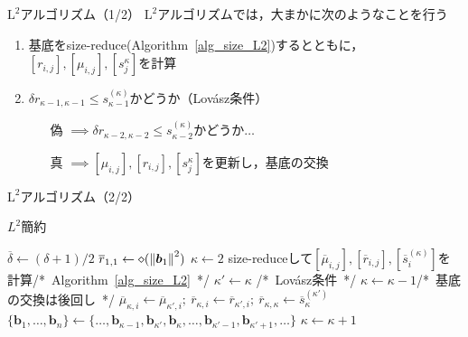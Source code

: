 \documentclass[12pt,aspectratio=169,table,dvipdfmx, leqno]{beamer}
\renewcommand{\Comment}[1]{\quad/*~#1~*/}
\begin{document}
\begin{frame}{$\text{L}^2$アルゴリズム（1/2）}
$\text{L}^2$アルゴリズムでは，大まかに次のようなことを行う
\begin{enumerate}
    \item 基底をsize-reduce(Algorithm~\ref{alg_size_L2})するとともに，$[r_{i, j}], [\mu_{i, j}], [s_j^{\kappa}]$を計算
    \item $\delta r_{\kappa-1, \kappa-1}\le s_{\kappa-1}^{(\kappa)}$かどうか（Lov\'asz条件）
    \begin{itemize}
        \item[偽] $\implies$$\delta r_{\kappa-2, \kappa-2}\le s_{\kappa-2}^{(\kappa)}$かどうか$\ldots$
        \item[真] $\implies$$[\mu_{i, j}], [r_{i, j}], [s_j^{\kappa}]$を更新し，基底の交換 
    \end{itemize}
\end{enumerate}
\end{frame}

\begin{frame}{$\text{L}^2$アルゴリズム（2/2）}
\begin{algorithm}[H]
    \footnotesize
    \begin{algorithmic}[1]
        \caption{\footnotesize $L^2$簡約}
        \label{alg_L2}
        \State $\overline{\delta}\gets(\delta+1)/2$
        \State $\overline{r}_{1,1}\gets\diamond(\norm{\bm{b}_1}^2)$
        \State $\kappa\gets 2$
            \State size-reduceして$[\overline{\mu}_{i, j}], [\overline{r}_{i, j}], [\overline{s}_{i}^{(\kappa)}]$を計算\Comment{Algorithm~\ref{alg_size_L2}}
            \State $\kappa'\gets\kappa$
            \Comment{Lov\'asz条件}
                \State $\kappa\gets\kappa-1$\Comment{基底の交換は後回し}
            \EndWhile
                \State $\overline{\mu}_{\kappa, i}\gets\overline{\mu}_{\kappa', i};~\overline{r}_{\kappa, i}\gets\overline{r}_{\kappa', i};~\overline{r}_{\kappa, \kappa}\gets\overline{s}_{\kappa}^{(\kappa')}$
            \EndFor
            \State $\{\bm{b}_1,\ldots,\bm{b}_n\}\gets\{\ldots,\bm{b}_{\kappa-1}, \bm{b}_{\kappa'}, \bm{b}_{\kappa},\ldots,\bm{b}_{\kappa'-1},\bm{b}_{\kappa'+1},\ldots\}$%
            \State $\kappa\gets \kappa+1$
        \EndWhile
    \end{algorithmic}
\end{algorithm}
\end{frame}
\end{document}
